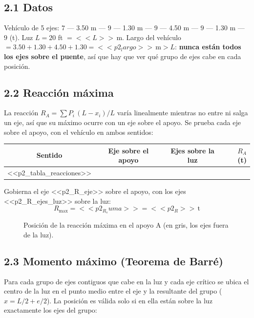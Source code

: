 \documentclass[11pt,a4paper]{article}
\newcommand{\uT}{\,\mathrm{t}}
\newcommand{\uM}{\,\mathrm{m}}
\newcommand{\vigaSA}[1]{%
  \draw[line width=1.8pt] (0,0) -- (#1,0);
  \draw[fill=white] (0,0) -- (-0.20,-0.36) -- (0.20,-0.36) -- cycle;
  \fill[pattern=north east lines] (-0.30,-0.36) rectangle (0.30,-0.48);
  \draw[fill=white] (#1,0) -- ({#1-0.20},-0.36) -- ({#1+0.20},-0.36) -- cycle;
  \draw ({#1-0.30},-0.44) -- ({#1+0.30},-0.44);
  \node[font=\scriptsize] at (0,-0.68) {A};
  \node[font=\scriptsize] at (#1,-0.68) {B};
}
\begin{document}
\subsection*{2.1 Datos}
Vehículo de 5 ejes: $7$ --- 3.50 m --- $9$ --- 1.30 m --- $9$ --- 4.50 m --- $9$ --- 1.30 m --- $9$ (t).
Luz $L = 20$ ft $= <<L>>\uM$. Largo del vehículo $= 3.50 + 1.30 + 4.50 + 1.30 = <<p2_largo>>\uM > L$:
\textbf{nunca están todos los ejes sobre el puente}, así que hay que ver qué grupo de ejes cabe en cada posición.

\subsection*{2.2 Reacción máxima}
La reacción $R_A = \sum P_i\,(L - x_i)/L$ varía linealmente mientras no entre ni salga un eje, así que su máximo
ocurre con un eje sobre el apoyo. Se prueba cada eje sobre el apoyo, con el vehículo en ambos sentidos:

\begin{center}\small
\begin{tabular}{cccr}
\toprule
Sentido & Eje sobre el apoyo & Ejes sobre la luz & $R_A$ (t)\\
\midrule
<<p2_tabla_reacciones>>
\bottomrule
\end{tabular}
\end{center}

Gobierna el eje <<p2_R_eje>> sobre el apoyo, con los ejes <<p2_R_ejes_luz>> sobre la luz:
\begin{equation*}
R_{\max} = <<p2_R_suma>> = \boxed{<<p2_R>>\uT}
\end{equation*}

\begin{figure}[H]
\centering
{}
\caption{Posición de la reacción máxima en el apoyo A (en gris, los ejes fuera de la luz).}
\end{figure}

\subsection*{2.3 Momento máximo (Teorema de Barré)}
Para cada grupo de ejes contiguos que cabe en la luz y cada eje crítico se ubica el centro de la luz en el punto
medio entre el eje y la resultante del grupo ($x = L/2 + e/2$). La posición es válida solo si en ella están
sobre la luz exactamente los ejes del grupo:
\end{document}
